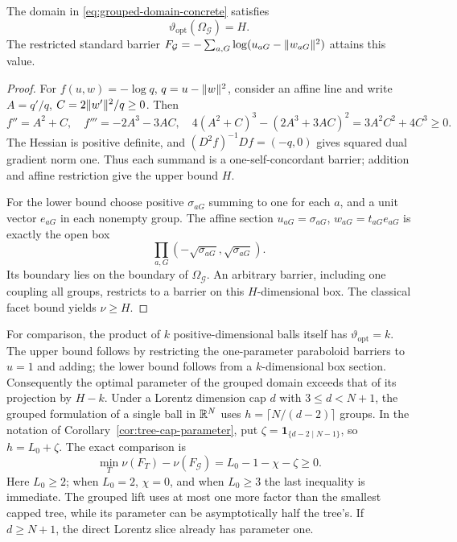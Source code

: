\begin{theorem}\label{thm:grouped-intrinsic}
The domain in \eqref{eq:grouped-domain-concrete} satisfies
\begin{equation}\label{eq:grouped-intrinsic}
 \vartheta_{\mathrm{opt}}(\Omega_{\mathcal G})=H.
\end{equation}
The restricted standard barrier
$F_{\mathcal G}=-\sum_{a,G}\log(u_{aG}-\lVert w_{aG}\rVert^2)$
attains this value.
\end{theorem}
\begin{proof}
For $f(u,w)=-\log q$, $q=u-\lVert w\rVert^2$, consider an affine line
and write $A=q'/q$, $C=2\lVert w'\rVert^2/q\geq0$.  Then
\[
 f''=A^2+C,\quad f'''=-2A^3-3AC,\quad
 4(A^2+C)^3-(2A^3+3AC)^2=3A^2C^2+4C^3\geq0.
\]
The Hessian is positive definite, and
$(D^2f)^{-1}Df=(-q,0)$ gives squared dual gradient norm one.
Thus each summand is a one-self-concordant barrier; addition and
affine restriction give the upper bound $H$.

For the lower bound choose positive $\sigma_{aG}$ summing to one
for each $a$, and a unit vector $e_{aG}$ in each nonempty group.
The affine section $u_{aG}=\sigma_{aG}$,
$w_{aG}=t_{aG}e_{aG}$ is exactly the open box
\[
 \prod_{a,G}(-\sqrt{\sigma_{aG}},\sqrt{\sigma_{aG}}).
\]
Its boundary lies on the boundary of $\Omega_{\mathcal G}$.
An arbitrary barrier, including one coupling all groups, restricts
to a barrier on this $H$-dimensional box.  The classical facet
bound \cite[Proposition~2.3.6]{NN1994} yields $\nu\geq H$.
\end{proof}

For comparison, the product of $k$ positive-dimensional balls itself
has $\vartheta_{\mathrm{opt}}=k$.  The upper bound follows by restricting
the one-parameter paraboloid barriers to $u=1$ and adding; the lower
bound follows from a $k$-dimensional box section.  Consequently the
optimal parameter of the grouped domain exceeds that of its projection
by $H-k$.
Under a Lorentz dimension cap $d$ with $3\leq d<N+1$, the grouped
formulation of a single ball in $\mathbb R^N$ uses $h=\lceil N/(d-2)\rceil$
groups.  In the notation of
Corollary~\ref{cor:tree-cap-parameter}, put
$\zeta=\mathbf1_{\{d-2\mid N-1\}}$, so $h=L_0+\zeta$.
The exact comparison is
\begin{equation}\label{eq:tree-grouped-gap}
 \min_T\nu(F_T)-\nu(F_{\mathcal G})
 =L_0-1-\chi-\zeta\geq0.
\end{equation}
Here $L_0\geq2$; when $L_0=2$, $\chi=0$, and when $L_0\geq3$
the last inequality is immediate.  The grouped lift uses at most one
more factor than the smallest capped tree, while its parameter can be
asymptotically half the tree's.  If $d\geq N+1$, the direct Lorentz
slice already has parameter one.

